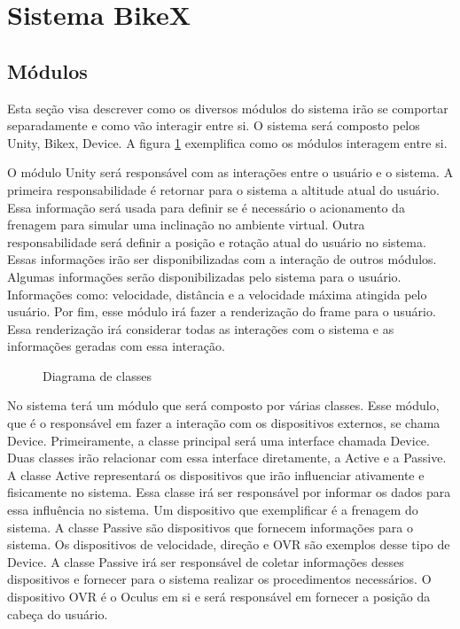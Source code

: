 \section{Sistema BikeX}
\label{sec:sistema_bikex}

\subsection{Módulos}
Esta seção visa descrever como os diversos módulos do sistema irão se comportar separadamente e como vão interagir entre si. O sistema será composto pelos Unity, Bikex, Device. A figura \ref{diagrama-classes} exemplifica como os módulos interagem entre si.

O módulo Unity será responsável com as interações entre o usuário e o sistema. A primeira responsabilidade é retornar para o sistema a altitude atual do usuário. Essa informação será usada para definir se é necessário o acionamento da frenagem para simular uma inclinação no ambiente virtual. Outra responsabilidade será definir a posição e rotação atual do usuário no sistema. Essas informações irão ser disponibilizadas com a interação de outros módulos. Algumas informações serão disponibilizadas pelo sistema para o usuário. Informações como: velocidade, distância e a velocidade máxima atingida pelo usuário. Por fim, esse módulo irá fazer a renderização do frame para o usuário. Essa renderização irá considerar todas as interações com o sistema e as informações geradas com essa interação.

\begin{figure}[h]
  \centering
  \caption{Diagrama de classes}
  \label{diagrama-classes}
\end{figure}

No sistema terá um módulo que será composto por várias classes. Esse módulo, que é o responsável em fazer a interação com os dispositivos externos, se chama Device. Primeiramente, a classe principal será uma interface chamada Device. Duas classes irão relacionar com essa interface diretamente, a Active e a Passive. A classe Active representará os dispositivos que irão influenciar ativamente e fisicamente no sistema. Essa classe irá ser responsável por informar os dados para essa influência no sistema. Um dispositivo que exemplificar é a frenagem do sistema. A classe Passive são dispositivos que fornecem informações para o sistema. Os dispositivos de velocidade, direção e OVR são exemplos desse tipo de Device. A classe Passive irá ser responsável de coletar informações desses dispositivos e fornecer para o sistema realizar os procedimentos necessários. O dispositivo OVR é o Oculus em si e será responsável em fornecer a posição da cabeça do usuário.

